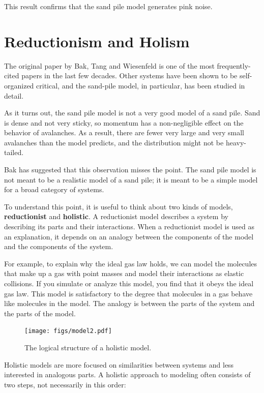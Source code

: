 \documentclass[12pt]{book}
\theoremstyle{exercise}
\begin{document}
This result confirms that the sand pile model generates pink noise.


\section{Reductionism and Holism}
\label{model2}
 
The original paper by Bak, Tang and Wiesenfeld is one of
the most frequently-cited papers in the last few decades.
Other systems have been shown to be self-organized critical,
and the sand-pile model, in particular, has been studied
in detail.

As it turns out, the sand pile model is not a very good model of a
sand pile.  Sand is dense and not very sticky, so momentum has a
non-negligible effect on the behavior of avalanches.  As a result,
there are fewer very large and very small avalanches than the model
predicts, and the distribution might not be heavy-tailed.

Bak has suggested that this observation misses the point.
The sand pile model is not meant to be a realistic model of a sand
pile; it is meant to be a simple model for a broad category of
systems.

To understand this point, it is useful to think about two
kinds of models, {\bf reductionist} and {\bf holistic}.  A
reductionist model describes a system by describing its parts
and their interactions.  When a reductionist model is used
as an explanation, it depends on an analogy between the
components of the model and the components of the system.


For example, to explain why the ideal gas law holds, we can model the
molecules that make up a gas with point masses and model their
interactions as elastic collisions.  If you simulate or analyze this
model, you find that it obeys the ideal gas law.  This model is
satisfactory to the degree that molecules in a gas behave like
molecules in the model.  The analogy is between the parts of the
system and the parts of the model.


\begin{figure}
\centerline{\texttt{[image: figs/model2.pdf]}}
\caption{The logical structure of a holistic model.\label{fig.model2}}
\end{figure}

Holistic models are more focused on similarities between systems and
less interested in analogous parts.  A holistic approach to modeling
often consists of two steps, not necessarily in this order:
\end{document}
